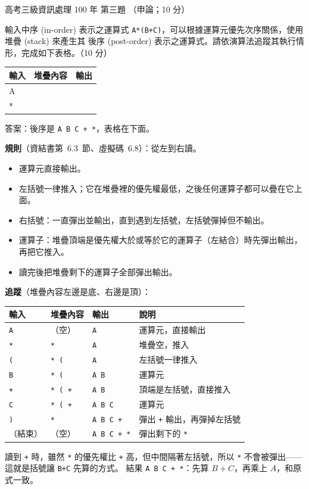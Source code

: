 \begin{pastexam}[label={px:gk3-100-ds-03}]{高考三級資訊處理 100 年 第三題}
（申論；10 分）

輸入中序 (in-order) 表示之運算式 \texttt{A*(B+C)}，可以根據運算元優先次序關係，使用堆疊 (stack) 來產生其
後序 (post-order) 表示之運算式。請依演算法追蹤其執行情形，完成如下表格。（10 分）
\begin{center}
\begin{tabular}{|l|l|l|}
\hline
輸入 & 堆疊內容 & 輸出 \\ \hline
A & & \\ \hline
* & & \\ \hline
\end{tabular}
\end{center}
\end{pastexam}

\begin{pastsoln}
答案：後序是 \texttt{A B C + *}，表格在下面。

\textbf{規則}（資結書第~6.3~節、虛擬碼~6.8）：從左到右讀。
\begin{itemize}
\item 運算元直接輸出。
\item 左括號一律推入；它在堆疊裡的優先權最低，之後任何運算子都可以疊在它上面。
\item 右括號：一直彈出並輸出，直到遇到左括號，左括號彈掉但不輸出。
\item 運算子：堆疊頂端是優先權大於或等於它的運算子（左結合）時先彈出輸出，再把它推入。
\item 讀完後把堆疊剩下的運算子全部彈出輸出。
\end{itemize}

\textbf{追蹤}（堆疊內容左邊是底、右邊是頂）：
\begin{center}
\begin{tabular}{|l|l|l|l|}
\hline
輸入 & 堆疊內容 & 輸出 & 說明 \\ \hline
\texttt{A} & （空） & \texttt{A} & 運算元，直接輸出 \\ \hline
\texttt{*} & \texttt{*} & \texttt{A} & 堆疊空，推入 \\ \hline
\texttt{(} & \texttt{* (} & \texttt{A} & 左括號一律推入 \\ \hline
\texttt{B} & \texttt{* (} & \texttt{A B} & 運算元 \\ \hline
\texttt{+} & \texttt{* ( +} & \texttt{A B} & 頂端是左括號，直接推入 \\ \hline
\texttt{C} & \texttt{* ( +} & \texttt{A B C} & 運算元 \\ \hline
\texttt{)} & \texttt{*} & \texttt{A B C +} & 彈出 \texttt{+} 輸出，再彈掉左括號 \\ \hline
（結束） & （空） & \texttt{A B C + *} & 彈出剩下的 \texttt{*} \\ \hline
\end{tabular}
\end{center}
讀到 \texttt{+} 時，雖然 \texttt{*} 的優先權比 \texttt{+} 高，但中間隔著左括號，所以 \texttt{*} 不會被彈出——
這就是括號讓 \texttt{B+C} 先算的方式。 結果 \texttt{A B C + *}：先算 $B + C$，再乘上 $A$，和原式一致。
\end{pastsoln}
